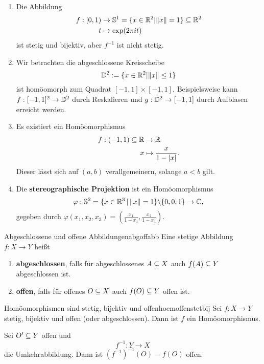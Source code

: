 \begin{beispiele}
\begin{enumerate}
\item Die Abbildung
\begin{align}
f: [0,1) &\to \mathbb{S}^1 = \{x \in \mathbb{R}^2 | \| x\| = 1 \} \subseteq \mathbb{R}^2\\
t &\mapsto \exp(2 \pi it)
\end{align}
ist stetig und bijektiv, aber $f^{-1}$ ist nicht stetig.
\item Wir betrachten die abgeschlossene Kreisscheibe
\begin{equation}
\mathbb{D}^2 := \{x \in \mathbb{R}^2 | \|x\| \leq 1\}
\end{equation}
ist homöomorph zum Quadrat $[-1,1] \times [-1,1]$. Beispielsweise kann $f: [-1,1]^2 \to \mathbb{D}^2$ durch Reskalieren und $g: \mathbb{D}^2 \to [-1,1]$ durch Aufblasen erreicht werden.
\item Es existiert ein Homöomorphismus 
\begin{align}
f: (-1,1) \subseteq \mathbb{R} &\to \mathbb{R}\\
x &\mapsto \frac{x}{1-|x|}.
\end{align}
Dieser lässt sich auf $(a,b)$ verallgemeinern, solange $a<b$ gilt.
\item Die \textbf{stereographische Projektion} ist ein Homöomorphismus
\begin{equation}
\varphi: \mathbb{S}^2 = \{x \in \mathbb{R}^3 \, | \, \| x\|=1 \} \backslash \{0,0,1\} \to \mathbb{C},
\end{equation}
gegeben durch $\varphi(x_1,x_2,x_3) = \left( \frac{x_1}{1-x_3}, \frac{x_2}{1-x_3}\right)$.
\end{enumerate}
\end{beispiele}
\begin{definition}{Abgeschlossene und offene Abbildungen}{abgoffabb}
Eine stetige Abbildung $f: X \to Y$ heißt
\begin{enumerate}
\item \textbf{abgeschlossen}, falls für abgeschlossenes $A \subseteq X$ auch $f(A) \subseteq Y$ abgeschlossen ist.
\item \textbf{offen}, falls für offenes $O \subseteq X$ auch $f(O) \subseteq Y$ offen ist.
\end{enumerate}
\end{definition}
\begin{satz}{Homöomorphismen sind stetig, bijektiv und offen}{hoemoffenstetbij}
Sei $f: X \to Y$ stetig, bijektiv und offen (oder abgeschlossen). Dann ist $f$ ein Homöomorphismus.
\end{satz}
\begin{beweis}
Sei $O' \subseteq Y$ offen und 
\begin{equation}
f^{-1}: Y \to X
\end{equation}
die Umkehrabbildung. Dann ist $(f^{-1})^{-1}(O) = f(O)$ offen.
\end{beweis}
